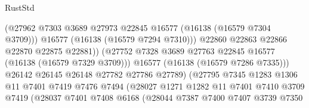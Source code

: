 \begin{lexlean}{RustStd}
\begin{coremodule}
                                          (@27962
                                            @7303
                                            @3689
                                            @27973
                                            @22845
                                            @16577
                                            (@16138 (@16579 @7304 @3709)))
                                          @16577
                                          (@16138 (@16579 @7294 @7310)))
                                        @22860
                                        @22863
                                        @22866
                                        @22870
                                        @22875
                                        @22881))
                                    (@27752
                                      @7328
                                      @3689
                                      @27763
                                      @22845
                                      @16577
                                      (@16138 (@16579 @7329 @3709)))
                                    @16577
                                    (@16138 (@16579 @7286 @7335)))
                                  @26142
                                  @26145
                                  @26148
                                  @27782
                                  @27786
                                  @27789)
                                (@27795
                                  @7345
                                  @1283
                                  @1306
                                  @11
                                  @7401
                                  @7419
                                  @7476
                                  @7494
                                  (@28027
                                    @1271
                                    @1282
                                    @11
                                    @7401
                                    @7410
                                    @3709
                                    @7419
                                    (@28037
                                      @7401
                                      @7408
                                      @6168
                                      (@28044
                                        @7387
                                        @7400
                                        @7407
                                        @3739
                                        @7350

\end{coremodule}
\end{lexlean}
